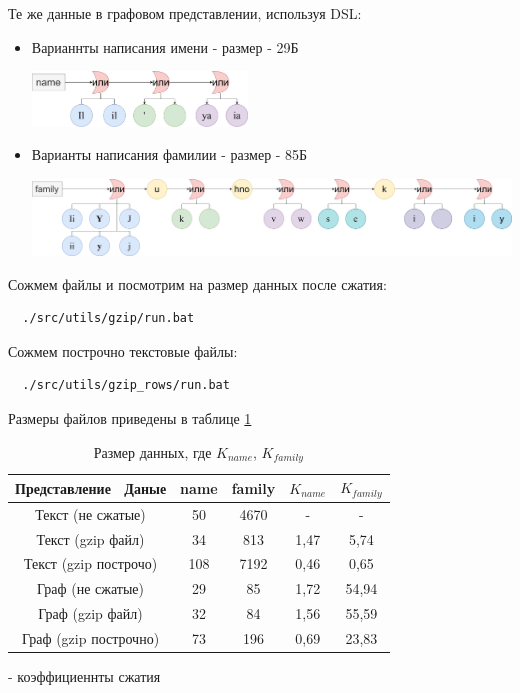 \documentclass[12pt,a4paper]{article}
\begin{document}
Те же данные в графовом представлении, используя DSL:
\begin{itemize}
    \item Варианнты написания имени -  размер - 29Б
    
\includegraphics[width=0.45\textwidth]{graph-name}

\item Варианты написания фамилии -  размер - 85Б

\includegraphics[width=1\textwidth]{graph-family}

\end{itemize}

Сожмем файлы и посмотрим на размер данных после сжатия:
\begin{lstlisting}
  ./src/utils/gzip/run.bat
\end{lstlisting}

Сожмем построчно текстовые файлы:
\begin{lstlisting}
  ./src/utils/gzip_rows/run.bat
\end{lstlisting}

Размеры файлов приведены в таблице \ref{files_size}

\begin{table}
\begin{center}
\begin{tabular}{|c|c|c|c|c|}
\hline
Представление \ Даные & name & family & $K_{name}$ & $K_{family}$\\
\hline
Текст (не сжатые) & 50 & 4670 & - & - \\
\hline
Текст (gzip файл) & 34 & 813 & 1,47 & 5,74 \\
\hline
Текст (gzip построчо) & 108 & 7192 & 0,46 & 0,65 \\
\hline
Граф (не сжатые) & 29 & 85 & 1,72 & 54,94 \\
\hline
Граф (gzip файл) & 32 & 84 & 1,56 & 55,59 \\
\hline
Граф (gzip построчно) & 73 & 196 & 0,69 & 23,83 \\
\hline
\end{tabular}
\end{center}
\caption{\label{files_size}Размер данных, где $K_{name}$, $K_{family}$} - коэффициеннты сжатия
\end{table} 
\end{document}
